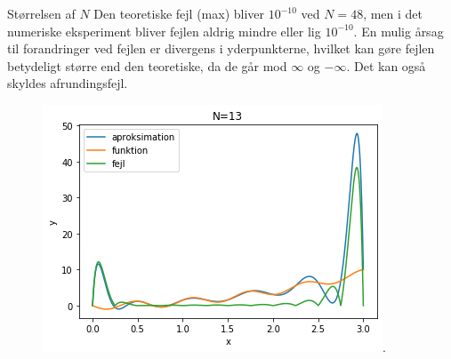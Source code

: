 
\begin{frame}{Størrelsen af $N$}
    Den teoretiske fejl (max) bliver $10^{-10}$ ved $N=48$, men i det numeriske eksperiment bliver fejlen aldrig mindre eller lig $10^{-10}$. 
    En mulig årsag til forandringer ved fejlen er divergens i yderpunkterne, hvilket kan gøre fejlen betydeligt større end den teoretiske, da de går mod $ \infty $ og $ - \infty $. Det kan også skyldes afrundingsfejl. 
    \begin{figure}
        \centering
            \includegraphics[scale=0.45]{images/N=13.png}.
    \end{figure}
\end{frame}